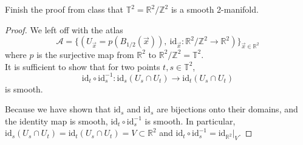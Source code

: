 \documentclass{article}
\newenvironment{problem}[2][Problem]{\begin{trivlist}
\item[\hskip \labelsep {\bfseries #1}\hskip \labelsep {\bfseries #2.}]}{\end{trivlist}}
\begin{document}
\pagebreak

\begin{problem}{6}
  Finish the proof from class that $\mathbb{T}^2 = \mathbb{R}^2/\mathbb{Z}^2$
  is a smooth 2-manifold.
\end{problem}

\begin{proof} \text{\\}
  We left off with the atlas \[
    \mathcal{A} = \{(
      U_{\vec{x}} = p(B_{1/2}(\vec{x})),\
      \mathrm{id}_{\vec{x}}: \mathbb{R}^2/\mathbb{Z}^2 \rightarrow \mathbb{R}^2
    )\}_{\vec{x}\in \mathbb{R}^2}
  \] where
  $p$ is the surjective map from $\mathbb{R}^2$ to $\mathbb{R}^2/\mathbb{Z}^2 = \mathbb{T}^2$.\\
  It is sufficient to show that for two points $t, s \in \mathbb{T}^2$, \[
    \mathrm{id}_{t} \circ \mathrm{id}_{s}^{-1} : \mathrm{id}_{s}(U_s \cap U_t) \rightarrow \mathrm{id}_{t}(U_s \cap U_t)
  \] is smooth.

  Because we have shown that $\mathrm{id}_s$ and $\mathrm{id}_s$ are bijections
  onto their domains, and the identity map is smooth,
  $\mathrm{id}_{t} \circ \mathrm{id}_{s}^{-1}$ is smooth. In particular,
  $\mathrm{id}_{s}(U_s \cap U_t) = \mathrm{id}_{t}(U_s \cap U_t) = V \subset \mathbb{R}^2$
  and $\mathrm{id}_{t} \circ \mathrm{id}_{s}^{-1} = \mathrm{id}_{\mathbb{R}^2}|_V$.
\end{proof}
\end{document}
